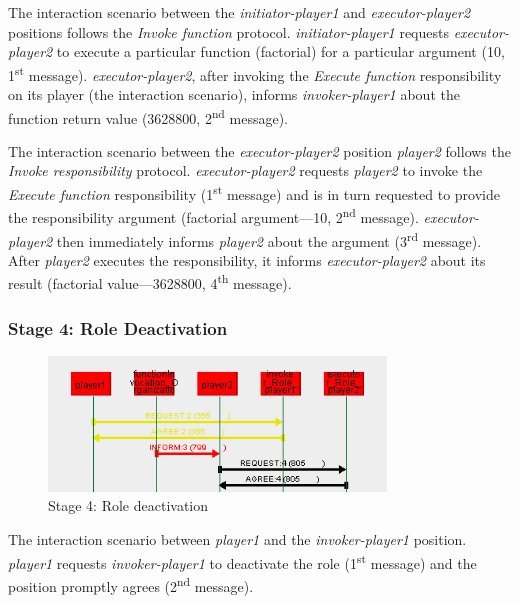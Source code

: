 The {} interaction scenario between the \textit{initiator-player1} and \textit{executor-player2} positions follows the \textit{Invoke function} protocol.
\textit{initiator-player1} requests \textit{executor-player2} to execute a particular function (factorial) for a particular argument (10, 1\textsuperscript{st} message).
\textit{executor-player2}, after invoking the \textit{Execute function} responsibility on its player (the {} interaction scenario), informs \textit{invoker-player1} about the function return value (3628800, 2\textsuperscript{nd} message).

The {} interaction scenario between the \textit{executor-player2} position \textit{player2} follows the \textit{Invoke responsibility} protocol.
\textit{executor-player2} requests \textit{player2} to invoke the \textit{Execute function} responsibility (1\textsuperscript{st} message) and is in turn requested to provide the responsibility argument (factorial argument---10, 2\textsuperscript{nd} message).
\textit{executor-player2} then immediately informs \textit{player2} about the argument (3\textsuperscript{rd} message).
After \textit{player2} executes the responsibility, it informs \textit{executor-player2} about its result (factorial value---3628800, 4\textsuperscript{th} message).

\subsubsection*{Stage 4: Role Deactivation}

\begin{figure}[H]
	\centering
	\includegraphics[width=0.8\textwidth]{images/examples/example1-stage4.png}
	\caption{Stage 4: Role deactivation}
	\label{figure:example1-stage4}
\end{figure}

The {} interaction scenario between \textit{player1}  and the \textit{invoker-player1} position.
\textit{player1} requests \textit{invoker-player1} to deactivate the role (1\textsuperscript{st} message) and the position promptly agrees (2\textsuperscript{nd} message).

